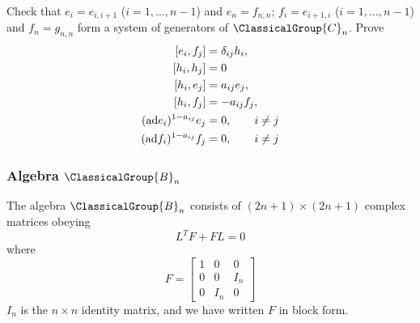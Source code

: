 \begin{exercise}
Check that $e_{i}=e_{i,i+1}$ ($i=1,...,n-1$) and $e_{n}=f_{n,n}$;
$f_{i}=e_{i+1,i}$ ($i=1,...,n-1$) and $f_{n}=g_{n,n}$ form a
system of generators of $\ClassicalGroup{C}_{n}$. Prove
\begin{subequations}
\begin{align}
[e_{i},f_{j}]&=\delta_{ij}h_{i},\\
[h_{i},h_{j}]&=0\\
[h_{i},e_{j}]&=a_{ij}e_{j},\\
[h_{i},f_{j}]&=-a_{ij}f_{j},\\
({\rm ad}e_{i})^{1-a_{ij}}e_{j}&=0,\qquad i\not=j \\
({\rm ad}f_{i})^{1-a_{ij}}f_{j}&=0,\qquad i\not=j
\end{align}
\end{subequations}
\end{exercise}
\subsubsection{Algebra \texorpdfstring{$\ClassicalGroup{B}_{n}$}{Bn}}

The algebra $\ClassicalGroup{B}_{n}$ consists of $(2n+1)\times(2n+1)$ complex
matrices obeying
\begin{equation}
L^{T}F+FL=0
\end{equation}
where
\begin{equation}
F=\begin{bmatrix}1&0&0\\
0&0&I_{n}\\
0&I_{n}&0
\end{bmatrix}
\end{equation}
$I_{n}$ is the $n\times n$ identity matrix, and we have written $F$ in block form.

